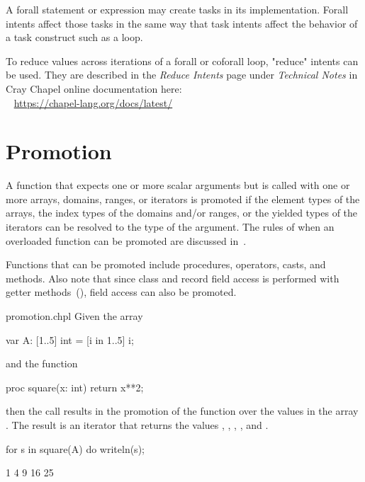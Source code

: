 \begin{rationale}
A forall statement or expression may create tasks in its implementation.
Forall intents affect those tasks in the same way that task intents
affect the behavior of a task construct such as a  loop.
\end{rationale}

\begin{craychapel}
To reduce values across iterations of a forall or coforall loop,
"reduce" intents can be used.
They are described in the \emph{Reduce Intents} page
under \emph{Technical Notes}
in Cray Chapel online documentation here:
\\ %
\mbox{$$ $$ $$} %
\url{https://chapel-lang.org/docs/latest/}
\end{craychapel}


\section{Promotion}
\label{Promotion}

A function that expects one or more scalar arguments but is called
with one or more arrays, domains, ranges, or iterators is promoted if
the element types of the arrays, the index types of the domains and/or
ranges, or the yielded types of the iterators can be resolved to the
type of the argument.  The rules of when an overloaded function can be
promoted are discussed in~.

Functions that can be promoted include procedures, operators, casts,
and methods. Also note that since class and record field access
is performed with getter methods~(), field
access can also be promoted.

\begin{chapelexample}{promotion.chpl}
Given the array
\begin{chapel}
var A: [1..5] int = [i in 1..5] i;
\end{chapel}
and the function
\begin{chapel}
proc square(x: int) return x**2;
\end{chapel}
then the call  results in the promotion of
the  function over the values in the array .  The
result is an iterator that returns the
values , , , , and .
\begin{chapelnoprint}
for s in square(A) do writeln(s);
\end{chapelnoprint}
\begin{chapeloutput}
1
4
9
16
25
\end{chapeloutput}
\end{chapelexample}

